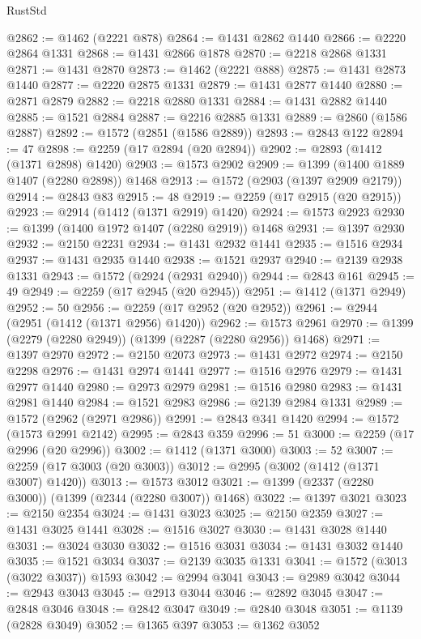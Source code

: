 \begin{lexlean}{RustStd}
\begin{coremodule}
@2862 := @1462 (@2221 @878)
@2864 := @1431 @2862 @1440
@2866 := @2220 @2864 @1331
@2868 := @1431 @2866 @1878
@2870 := @2218 @2868 @1331
@2871 := @1431 @2870
@2873 := @1462 (@2221 @888)
@2875 := @1431 @2873 @1440
@2877 := @2220 @2875 @1331
@2879 := @1431 @2877 @1440
@2880 := @2871 @2879
@2882 := @2218 @2880 @1331
@2884 := @1431 @2882 @1440
@2885 := @1521 @2884
@2887 := @2216 @2885 @1331
@2889 := @2860 (@1586 @2887)
@2892 := @1572 (@2851 (@1586 @2889))
@2893 := @2843 @122
@2894 := 47
@2898 := @2259 (@17 @2894 (@20 @2894))
@2902 := @2893 (@1412 (@1371 @2898) @1420)
@2903 := @1573 @2902
@2909 := @1399 (@1400 @1889 @1407 (@2280 @2898)) @1468
@2913 := @1572 (@2903 (@1397 @2909 @2179))
@2914 := @2843 @83
@2915 := 48
@2919 := @2259 (@17 @2915 (@20 @2915))
@2923 := @2914 (@1412 (@1371 @2919) @1420)
@2924 := @1573 @2923
@2930 := @1399 (@1400 @1972 @1407 (@2280 @2919)) @1468
@2931 := @1397 @2930
@2932 := @2150 @2231
@2934 := @1431 @2932 @1441
@2935 := @1516 @2934
@2937 := @1431 @2935 @1440
@2938 := @1521 @2937
@2940 := @2139 @2938 @1331
@2943 := @1572 (@2924 (@2931 @2940))
@2944 := @2843 @161
@2945 := 49
@2949 := @2259 (@17 @2945 (@20 @2945))
@2951 := @1412 (@1371 @2949)
@2952 := 50
@2956 := @2259 (@17 @2952 (@20 @2952))
@2961 := @2944 (@2951 (@1412 (@1371 @2956) @1420))
@2962 := @1573 @2961
@2970 := @1399 (@2279 (@2280 @2949)) (@1399 (@2287 (@2280 @2956)) @1468)
@2971 := @1397 @2970
@2972 := @2150 @2073
@2973 := @1431 @2972
@2974 := @2150 @2298
@2976 := @1431 @2974 @1441
@2977 := @1516 @2976
@2979 := @1431 @2977 @1440
@2980 := @2973 @2979
@2981 := @1516 @2980
@2983 := @1431 @2981 @1440
@2984 := @1521 @2983
@2986 := @2139 @2984 @1331
@2989 := @1572 (@2962 (@2971 @2986))
@2991 := @2843 @341 @1420
@2994 := @1572 (@1573 @2991 @2142)
@2995 := @2843 @359
@2996 := 51
@3000 := @2259 (@17 @2996 (@20 @2996))
@3002 := @1412 (@1371 @3000)
@3003 := 52
@3007 := @2259 (@17 @3003 (@20 @3003))
@3012 := @2995 (@3002 (@1412 (@1371 @3007) @1420))
@3013 := @1573 @3012
@3021 := @1399 (@2337 (@2280 @3000)) (@1399 (@2344 (@2280 @3007)) @1468)
@3022 := @1397 @3021
@3023 := @2150 @2354
@3024 := @1431 @3023
@3025 := @2150 @2359
@3027 := @1431 @3025 @1441
@3028 := @1516 @3027
@3030 := @1431 @3028 @1440
@3031 := @3024 @3030
@3032 := @1516 @3031
@3034 := @1431 @3032 @1440
@3035 := @1521 @3034
@3037 := @2139 @3035 @1331
@3041 := @1572 (@3013 (@3022 @3037)) @1593
@3042 := @2994 @3041
@3043 := @2989 @3042
@3044 := @2943 @3043
@3045 := @2913 @3044
@3046 := @2892 @3045
@3047 := @2848 @3046
@3048 := @2842 @3047
@3049 := @2840 @3048
@3051 := @1139 (@2828 @3049)
@3052 := @1365 @397
@3053 := @1362 @3052

\end{coremodule}
\end{lexlean}
